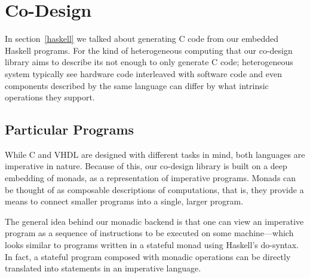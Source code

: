 \documentclass[../main.tex]{subfiles}
\begin{document}
\chapter{Co-Design}
\label{codesign}

In section~\ref{haskell} we talked about generating C code from our embedded Haskell programs. For the kind of heterogeneous computing that our co-design library aims to describe its not enough to only generate C code; heterogeneous system typically see hardware code interleaved with software code and even components described by the same language can differ by what intrinsic operations they support.



\section{Particular Programs}
\label{program}

While C and VHDL are designed with different tasks in mind, both languages are imperative in nature. Because of this, our co-design library is built on a deep embedding of monads, as a representation of imperative programs. Monads can be thought of as composable descriptions of computations, that is, they provide a means to connect smaller programs into a single, larger program.

The general idea behind our monadic backend is that one can view an imperative program as a sequence of instructions to be executed on some machine---which looks similar to programs written in a stateful monad using Haskell's do-syntax. In fact, a stateful program composed with monadic operations can be directly translated into statements in an imperative language.

\end{document}
